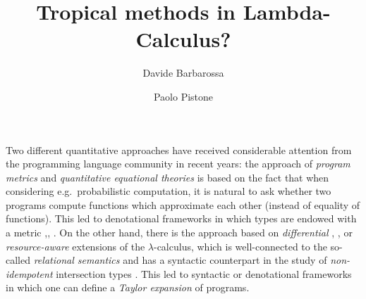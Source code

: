 \documentclass[submission,%
]{eptcs}
\title{Tropical methods in Lambda-Calculus?}
\author{Davide Barbarossa
\institute{DISI, Universit\`a di Bologna}
\email{davide.barbarossa@unibo.it}
\and
\qquad\qquad Paolo Pistone
\institute{\qquad\qquad\qquad DISI, Universit\`a di Bologna}
\email{\qquad\qquad\qquad paolo.pistone@unibo.it}
}
\begin{document}
\maketitle



Two different quantitative approaches have received considerable attention from the programming language community in recent years: %
the approach of \emph{program metrics} \cite{Reed2010, Gaboardi2017, Gabo2019} and \emph{quantitative equational theories} \cite{Plotk} is based on the fact that when considering e.g.\ probabilistic %
computation, %
it is natural to ask whether two programs compute functions which %
approximate each other (instead of equality of functions).
This led to denotational frameworks in which types are endowed with a metric \cite{Reed2010},\cite{Bonchi2018}, \cite{Geoffroy2020, PistoneLICS, PistoneFSCD2022}.
On the other hand, there is the approach based on \emph{differential} \cite{difflambda}, \cite{difflambda}, \cite{Manzo2013, Breuvart2018, PistoneLICS2022} or \emph{resource-aware} \cite{Boudol1993} extensions of the $\lambda$-calculus, which is well-connected to the so-called \emph{relational semantics} \cite{Manzo2012, Manzo2013, dill} and has a syntactic counterpart in the study of \emph{non-idempotent} intersection types \cite{decarvalho2018, Mazza2016}.
This led to syntactic or denotational frameworks in which one can define a \emph{Taylor expansion} of programs.
\end{document}
